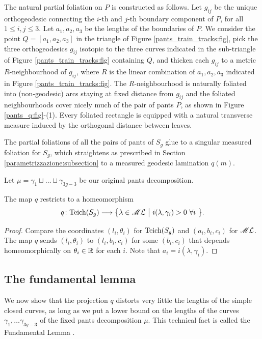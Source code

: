 The natural partial foliation on $P$ is constructed as follows. Let $g_{ij}$ be the unique orthogeodesic connecting the $i$-th and $j$-th boundary component of $P$, for all $1 \leqslant i,j \leqslant 3$. Let $a_1, a_2, a_3$ be the lengths of the boundaries of $P$. We consider the point $Q=[a_1,a_2,a_3]$ in the triangle of Figure \ref{pants_train_tracks:fig}, pick the three orthogeodesics $g_{ij}$ isotopic to the three curves indicated in the sub-triangle of Figure \ref{pants_train_tracks:fig} containing $Q$, and thicken each $g_{ij}$ to a metric $R$-neighbourhood of $g_{ij}$, where $R$ is the linear combination of $a_1,a_2,a_3$ indicated in Figure \ref{pants_train_tracks:fig}. The $R$-neighbourhood is naturally foliated into (non-geodesic) arcs staying at fixed distance from $g_{ij}$ and the foliated neighbourhoods cover nicely much of the pair of pants $P$, as shown in Figure \ref{pants_q:fig}-(1). 
Every foliated rectangle is equipped with a natural transverse measure induced by the orthogonal distance between leaves.

The partial foliations of all the pairs of pants of $S_g$ glue to a singular measured foliation for $S_g$, which straightens as prescribed in Section \ref{parametrizzazione:subsection} to a measured geodesic lamination $q(m)$. 

Let $\mu = \gamma_1\sqcup \ldots \sqcup \gamma_{3g-3}$ be our original pants decomposition.

\begin{prop} \label{q:homeom:prop}
The map $q$ restricts to a homeomorphism
$$q\colon {\rm Teich}(S_g) \longrightarrow \big\{\lambda \in \mathscr{M}\mathcal{L} \ \big|\ i(\lambda, \gamma_i)>0\ \forall i\ \big\}.$$
\end{prop}
\begin{proof}
Compare the coordinates $(l_i, \theta_i)$ for ${\rm Teich}(S_g)$ and $(a_i,b_i,c_i)$ for $\mathscr{M}\mathcal{L}$. The map $q$ sends $(l_i,\theta_i)$ to $(l_i,b_i,c_i)$ for some $(b_i,c_i)$ that depends homeomorphically on $\theta_i\in\mathbb{R}$ for each $i$.
Note that $a_i = i(\lambda, \gamma_i)$.
\end{proof}

\subsection{The fundamental lemma}
We now show that the projection $q$ distorts very little the lengths of the simple closed curves, as long as we put a lower bound on the lengths of the curves $\gamma_1,\ldots \gamma_{3g-3}$ of the fixed pants decomposition $\mu$. This technical fact is called the Fundamental Lemma \cite{FLP}.

